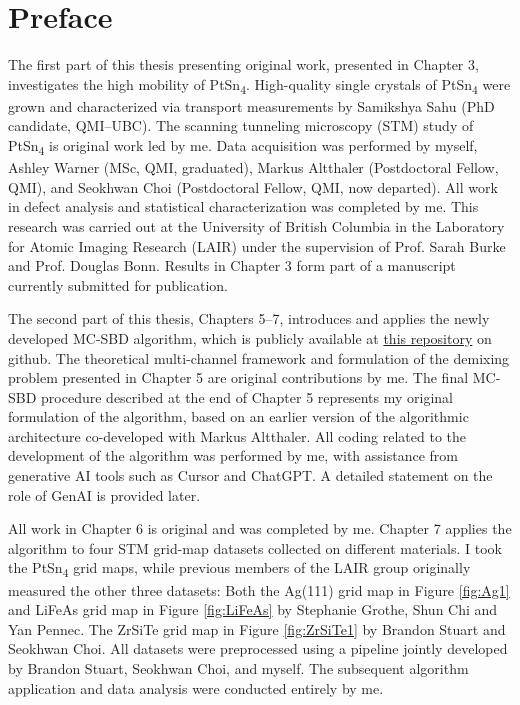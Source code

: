 
\chapter{Preface}
The first part of this thesis presenting original work, presented in Chapter 3, investigates the high mobility of PtSn\textsubscript{4}. High-quality single crystals of PtSn\textsubscript{4} were grown and characterized via transport measurements by Samikshya Sahu (PhD candidate, QMI–UBC). The scanning tunneling microscopy (STM) study of PtSn\textsubscript{4} is original work led by me. Data acquisition was performed by myself, Ashley Warner (MSc, QMI, graduated), Markus Altthaler (Postdoctoral Fellow, QMI), and Seokhwan Choi (Postdoctoral Fellow, QMI, now departed). All work in defect analysis and statistical characterization was completed by me. This research was carried out at the University of British Columbia in the Laboratory for Atomic Imaging Research (LAIR) under the supervision of Prof. Sarah Burke and Prof. Douglas Bonn. Results in Chapter 3 form part of a manuscript currently submitted for publication.

The second part of this thesis, Chapters 5–7, introduces and applies the newly developed \ac{MC-SBD} algorithm, which is publicly available at  \href{https://github.com/Plswearpants/MT-SBD-STM}{this repository} on github. The theoretical multi-channel framework and formulation of the demixing problem presented in Chapter 5 are original contributions by me. The final \ac{MC-SBD} procedure described at the end of Chapter 5 represents my original formulation of the algorithm, based on an earlier version of the algorithmic architecture co-developed with Markus Altthaler. All coding related to the development of the algorithm was performed by me, with assistance from generative AI tools such as Cursor and ChatGPT. A detailed statement on the role of GenAI is provided later.

All work in Chapter 6 is original and was completed by me. Chapter 7 applies the algorithm to four STM grid-map datasets collected on different materials. I took the PtSn\textsubscript{4} grid maps, while previous members of the LAIR group originally measured the other three datasets: Both the Ag(111) grid map in Figure \ref{fig:Ag1} and LiFeAs grid map in Figure \ref{fig:LiFeAs} by Stephanie Grothe, Shun Chi and Yan Pennec. The ZrSiTe grid map in Figure \ref{fig:ZrSiTe1} by Brandon Stuart and Seokhwan Choi. All datasets were preprocessed using a pipeline jointly developed by Brandon Stuart, Seokhwan Choi, and myself. The subsequent algorithm application and data analysis were conducted entirely by me.

